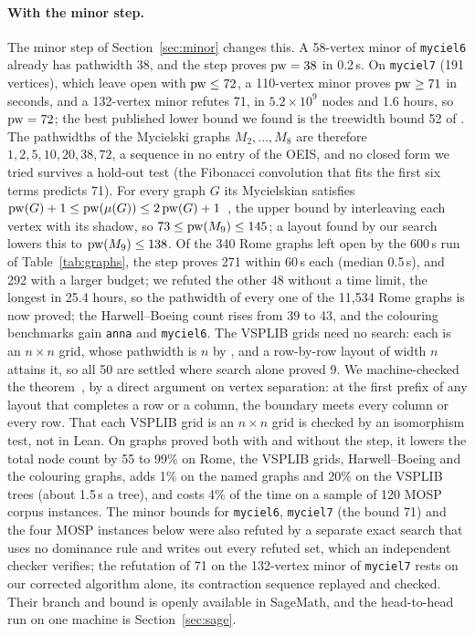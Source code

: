 \paragraph{With the minor step.} The minor step of Section~\ref{sec:minor}
changes this. A 58-vertex minor of \texttt{myciel6} already has pathwidth 38,
and the step proves $\mathrm{pw}=38$ in 0.2\,s. On \texttt{myciel7} (191 vertices),
which \citet{CoudertMazauricNisse2016} leave open with $\mathrm{pw}\le72$, a
110-vertex minor proves $\mathrm{pw}\ge71$ in seconds, and a 132-vertex minor refutes
71, in $5.2\times10^{9}$ nodes and 1.6 hours, so $\mathrm{pw}=72$; the best published
lower bound we found is the treewidth bound 52 of
\citet{BodlaenderWolleKoster2006}. The pathwidths of the Mycielski graphs
$M_2,\dots,M_8$ are therefore $1, 2, 5, 10, 20, 38, 72$, a sequence in no
entry of the OEIS, and no closed form we tried survives a hold-out test (the
Fibonacci convolution that fits the first six terms predicts 71). For every
graph $G$ its Mycielskian satisfies
$\mathrm{pw}(G)+1\le\mathrm{pw}(\mu(G))\le2\,\mathrm{pw}(G)+1$~, the upper bound by
interleaving each vertex with its shadow, so $73\le\mathrm{pw}(M_9)\le145$; a layout found by our search lowers this to $\mathrm{pw}(M_9)\le138$. Of the 340 Rome graphs left open by the 600\,s run of
Table~\ref{tab:graphs}, the step proves 271 within 60\,s each (median 0.5\,s),
and 292 with a larger budget; we refuted the other 48 without a time limit,
the longest in 25.4 hours, so the pathwidth of every one of the 11,534 Rome
graphs is now proved;
the Harwell--Boeing count rises from 39 to 43, and the colouring benchmarks
gain \texttt{anna} and \texttt{myciel6}. The VSPLIB grids need no search: each
is an $n\times n$ grid, whose pathwidth is $n$ by
\citet[Theorem~4.1]{EllisWarren2008}, and a row-by-row layout of width $n$ attains it, so all 50 are settled where
search alone proved 9. We machine-checked the theorem~, by a
direct argument on vertex separation: at the first prefix of any layout that
completes a row or a column, the boundary meets every column or every row.
That each VSPLIB grid is an $n\times n$ grid is checked by an isomorphism
test, not in Lean. On graphs proved both with and without
the step, it lowers the total node count by 55 to 99\% on Rome, the VSPLIB grids,
Harwell--Boeing and the colouring graphs, adds 1\% on the named graphs and
20\% on the VSPLIB trees (about 1.5\,s a tree), and costs 4\% of the time on
a sample of 120 MOSP corpus instances. The minor bounds for \texttt{myciel6},
\texttt{myciel7} (the bound 71) and the four MOSP instances below were also refuted by a
separate exact search that uses no dominance rule and writes out every refuted
set, which an independent checker verifies; the refutation of 71 on the
132-vertex minor of \texttt{myciel7} rests on our corrected algorithm alone, its
contraction sequence replayed and checked. Their branch and bound is openly available in SageMath, and the
head-to-head run on one machine is Section~\ref{sec:sage}.

